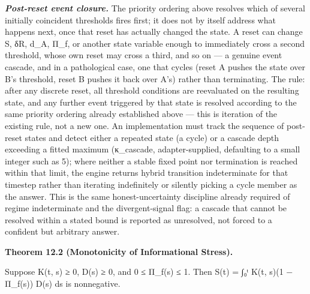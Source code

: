 \documentclass[
]{article}
\begin{document}
\emph{\textbf{Post-reset event closure.}} The priority ordering above
resolves which of several initially coincident thresholds fires first;
it does not by itself address what happens next, once that reset has
actually changed the state. A reset can change S, δR, d\_A, Π\_f, or
another state variable enough to immediately cross a second threshold,
whose own reset may cross a third, and so on --- a genuine event
cascade, and in a pathological case, one that cycles (reset A pushes the
state over B's threshold, reset B pushes it back over A's) rather than
terminating. The rule: after any discrete reset, all threshold
conditions are reevaluated on the resulting state, and any further event
triggered by that state is resolved according to the same priority
ordering already established above --- this is iteration of the existing
rule, not a new one. An implementation must track the sequence of
post-reset states and detect either a repeated state (a cycle) or a
cascade depth exceeding a fitted maximum (κ\_cascade, adapter-supplied,
defaulting to a small integer such as 5); where neither a stable fixed
point nor termination is reached within that limit, the engine returns
hybrid transition indeterminate for that timestep rather than iterating
indefinitely or silently picking a cycle member as the answer. This is
the same honest-uncertainty discipline already required of regime
indeterminate and the divergent-signal flag: a cascade that cannot be
resolved within a stated bound is reported as unresolved, not forced to
a confident but arbitrary answer.

\textbf{Theorem 12.2 (Monotonicity of Informational Stress).}

Suppose K(t, s) ≥ 0, D(s) ≥ 0, and 0 ≤ Π\_f(s) ≤ 1. Then S(t) = ∫₀ᵗ K(t,
s)(1 − Π\_f(s)) D(s) ds is nonnegative.
\end{document}
